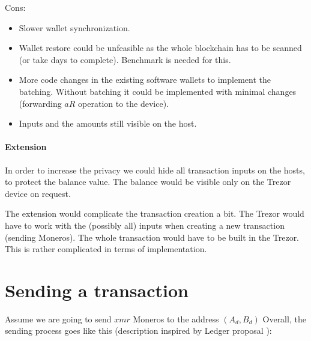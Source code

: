 \documentclass[]{article}
\begin{document}
\noindent Cons:
\begin{itemize}
	\item Slower wallet synchronization.
	\item Wallet restore could be unfeasible as the whole blockchain has to be scanned (or take days to complete). Benchmark is needed for this.
	\item More code changes in the existing software wallets to implement the batching. Without batching it could be implemented with minimal changes (forwarding $aR$ operation to the device).
	\item Inputs and the amounts still visible on the host.
\end{itemize}

\paragraph{Extension} In order to increase the privacy we could hide all transaction inputs on the hosts, to protect the balance value. The balance would be visible only on the Trezor device on request.

The extension would complicate the transaction creation a bit. The Trezor would have to work with the (possibly all) inputs when creating a new transaction (sending Moneros). The whole transaction would have to be built in the Trezor. This is rather complicated in terms of implementation. 


\section{Sending a transaction}
Assume we are going to send $xmr$ Moneros to the address $(A_d, B_d)$
Overall, the sending process goes like this (description inspired by Ledger proposal \cite{ledger_doc}):
\end{document}
